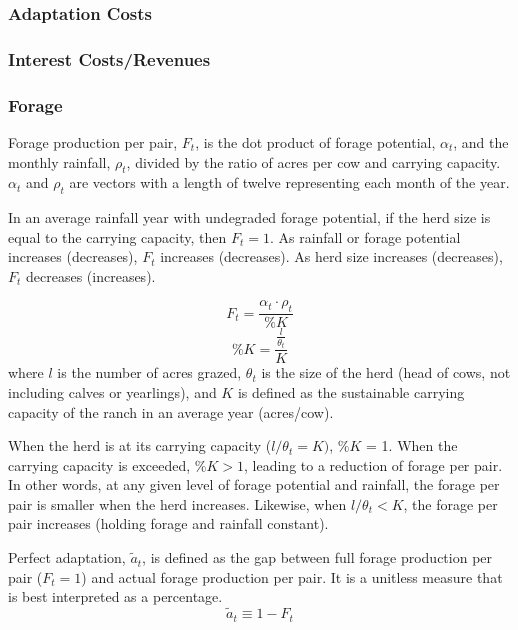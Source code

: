 \documentclass[11pt]{article}
\begin{document}
\subsubsection{Adaptation Costs}


\subsubsection{Interest Costs/Revenues}


\subsubsection{Forage}
\label{forage}
Forage production per pair, $F_t$, is the dot product of forage potential, $\alpha_t$, and the monthly rainfall, $\rho_t$, divided by the ratio of acres per cow and carrying capacity. $\alpha_t$ and $\rho_t$ are vectors with a length of twelve representing each month of the year. 

In an average rainfall year with undegraded forage potential, if the herd size is equal to the carrying capacity, then $F_t = 1$. As rainfall or forage potential increases (decreases), $F_t$ increases (decreases). As herd size increases (decreases), $F_t$ decreases (increases). 

\begin{equation}
F_t = \frac{\alpha_t \cdot \rho_t}{\%K}
\end{equation}
\begin{equation}
\%K = \frac{\frac{l}{\theta_t}}{K}
\end{equation}
where $l$ is the number of acres grazed, $\theta_t$ is the size of the herd (head of cows, not including calves or yearlings), and $K$ is defined as the sustainable carrying capacity of the ranch in an average year (acres/cow).

When the herd is at its carrying capacity ($l/\theta_t = K)$, $\%K$ = 1. When the carrying capacity is exceeded, $\%K > 1$, leading to a reduction of forage per pair. In other words, at any given level of forage potential and rainfall, the forage per pair is smaller when the herd increases. Likewise, when $l / \theta_t < K$, the forage per pair increases (holding forage and rainfall constant). 

Perfect adaptation, $\tilde{a}_t$, is defined as the gap between full forage production per pair ($F_t = 1$) and actual forage production per pair. It is a unitless measure that is best interpreted as a percentage.
\begin{equation}
\tilde{a}_t \equiv 1 - F_t
\end{equation}
\end{document}
